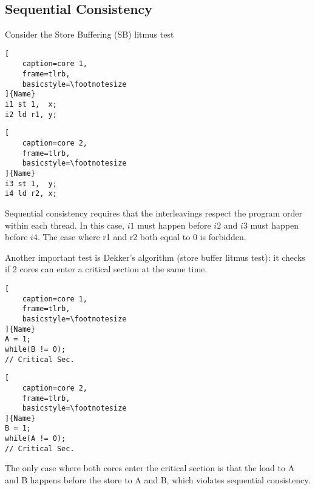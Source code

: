 \documentclass{article}
\begin{document}
\begin{multicols*}{2}
\subsection{Sequential Consistency}
Consider the Store Buffering (SB) litmus test

\noindent\begin{minipage}{.2\textwidth}
\captionsetup{labelformat=empty}
\begin{lstlisting}[
    caption=core 1,
    frame=tlrb, 
    basicstyle=\footnotesize
]{Name}
i1 st 1,  x;
i2 ld r1, y;
\end{lstlisting}
\end{minipage}\hfill
\begin{minipage}{.2\textwidth}
\captionsetup{labelformat=empty}
\begin{lstlisting}[
    caption=core 2,
    frame=tlrb,
    basicstyle=\footnotesize
]{Name}
i3 st 1,  y;
i4 ld r2, x;
\end{lstlisting}
\end{minipage}

\noindent\newline
Sequential consistency requires that the interleavings respect the program order within each thread. In this case, $i1$ must happen before $i2$ and $i3$ must happen before $i4$. The case where r1 and r2 both equal to 0 is forbidden.
\medskip\par\noindent
Another important test is Dekker's algorithm (store buffer litmus test): it checks if 2 cores can enter a critical section at the same time.

\noindent\begin{minipage}{.2\textwidth}
\captionsetup{labelformat=empty}
\begin{lstlisting}[
    caption=core 1,
    frame=tlrb, 
    basicstyle=\footnotesize
]{Name}
A = 1;
while(B != 0);
// Critical Sec.
\end{lstlisting}
\end{minipage}\hfill
\begin{minipage}{.2\textwidth}
\captionsetup{labelformat=empty}
\begin{lstlisting}[
    caption=core 2,
    frame=tlrb,
    basicstyle=\footnotesize
]{Name}
B = 1;
while(A != 0);
// Critical Sec.
\end{lstlisting}
\end{minipage}

\noindent\newline
The only case where both cores enter the critical section is that the load to A and B happens before the store to A and B, which violates sequential consistency.


\end{multicols*}
\end{document}
